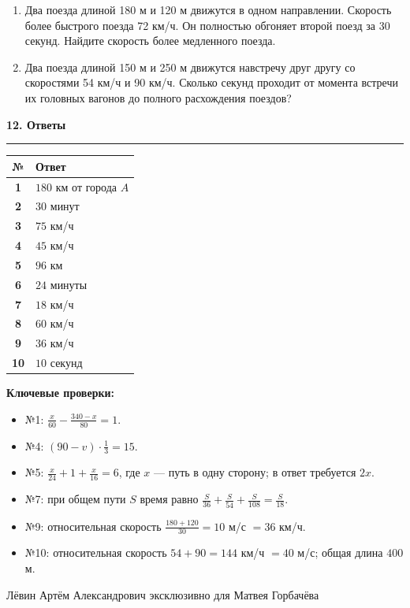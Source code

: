 \documentclass[a4paper,12pt]{article}
\newcommand{\sectiontitle}[1]{%
  \vspace{2mm}%
  {\Large\bfseries\color{darkaccent}#1}\par
  \vspace{1mm}\color{rulegray}\hrule\color{textgray}\vspace{3mm}%
}
\begin{document}
\begin{enumerate}
  \item Два поезда длиной 180 м и 120 м движутся в одном направлении. Скорость более быстрого поезда 72 км/ч. Он полностью обгоняет второй поезд за 30 секунд. Найдите скорость более медленного поезда.

  \item Два поезда длиной 150 м и 250 м движутся навстречу друг другу со скоростями 54 км/ч и 90 км/ч. Сколько секунд проходит от момента встречи их головных вагонов до полного расхождения поездов?
\end{enumerate}

\clearpage

\sectiontitle{12. Ответы}

\begin{center}
\begin{tabularx}{0.92\linewidth}{@{}>{\bfseries}cX@{}}
\toprule
№ & Ответ \\
\midrule
1 & $180$ км от города $A$ \\
2 & $30$ минут \\
3 & $75$ км/ч \\
4 & $45$ км/ч \\
5 & $96$ км \\
6 & $24$ минуты \\
7 & $18$ км/ч \\
8 & $60$ км/ч \\
9 & $36$ км/ч \\
10 & $10$ секунд \\
\bottomrule
\end{tabularx}
\end{center}

\vspace{7mm}
\textbf{Ключевые проверки:}
\begin{itemize}
  \item №1: $\frac{x}{60}-\frac{340-x}{80}=1$.
  \item №4: $(90-v)\cdot\frac13=15$.
  \item №5: $\frac{x}{24}+1+\frac{x}{16}=6$, где $x$ — путь в одну сторону; в ответ требуется $2x$.
  \item №7: при общем пути $S$ время равно $\frac{S}{36}+\frac{S}{54}+\frac{S}{108}=\frac{S}{18}$.
  \item №9: относительная скорость $\frac{180+120}{30}=10$ м/с $=36$ км/ч.
  \item №10: относительная скорость $54+90=144$ км/ч $=40$ м/с; общая длина $400$ м.
\end{itemize}

\vfill
{\small\color{softgray}Лёвин Артём Александрович эксклюзивно для Матвея Горбачёва}
\end{document}
